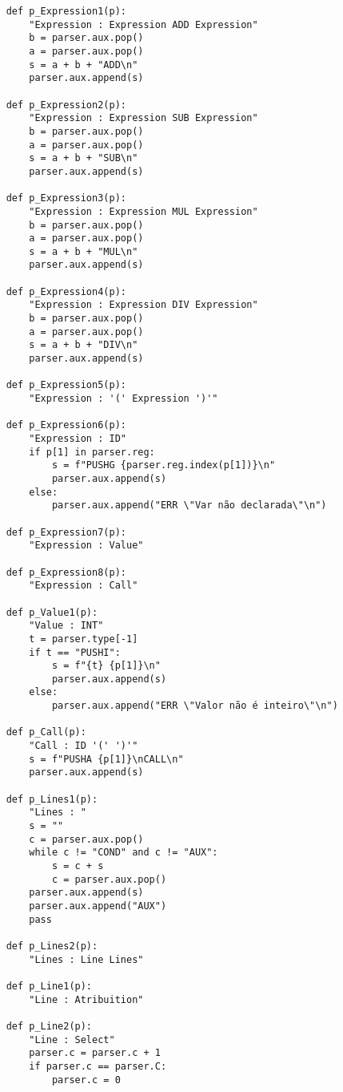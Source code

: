 \documentclass[12pt,a4paper]{report}
\begin{document}
\begin{lstlisting}
    def p_Expression1(p):
        "Expression : Expression ADD Expression"
        b = parser.aux.pop()
        a = parser.aux.pop()
        s = a + b + "ADD\n"
        parser.aux.append(s)
    
    def p_Expression2(p):
        "Expression : Expression SUB Expression"
        b = parser.aux.pop()
        a = parser.aux.pop()
        s = a + b + "SUB\n"
        parser.aux.append(s)
    
    def p_Expression3(p):
        "Expression : Expression MUL Expression"
        b = parser.aux.pop()
        a = parser.aux.pop()
        s = a + b + "MUL\n"
        parser.aux.append(s)
    
    def p_Expression4(p):
        "Expression : Expression DIV Expression"
        b = parser.aux.pop()
        a = parser.aux.pop()
        s = a + b + "DIV\n"
        parser.aux.append(s)
    
    def p_Expression5(p):
        "Expression : '(' Expression ')'"
    
    def p_Expression6(p):
        "Expression : ID"
        if p[1] in parser.reg:
            s = f"PUSHG {parser.reg.index(p[1])}\n"
            parser.aux.append(s)
        else:
            parser.aux.append("ERR \"Var não declarada\"\n")
    
    def p_Expression7(p):
        "Expression : Value"
    
    def p_Expression8(p):
        "Expression : Call"
    
    def p_Value1(p):
        "Value : INT"
        t = parser.type[-1]
        if t == "PUSHI":
            s = f"{t} {p[1]}\n"
            parser.aux.append(s)
        else:
            parser.aux.append("ERR \"Valor não é inteiro\"\n")
    
    def p_Call(p):
        "Call : ID '(' ')'"
        s = f"PUSHA {p[1]}\nCALL\n"
        parser.aux.append(s)
    
    def p_Lines1(p):
        "Lines : "
        s = ""
        c = parser.aux.pop()
        while c != "COND" and c != "AUX":
            s = c + s
            c = parser.aux.pop()
        parser.aux.append(s)
        parser.aux.append("AUX")
        pass
    
    def p_Lines2(p):
        "Lines : Line Lines"
    
    def p_Line1(p):
        "Line : Atribuition"
    
    def p_Line2(p):
        "Line : Select"
        parser.c = parser.c + 1
        if parser.c == parser.C:
            parser.c = 0
    

\end{lstlisting}
\end{document}
